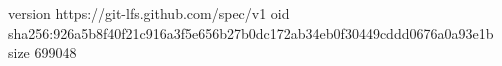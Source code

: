 version https://git-lfs.github.com/spec/v1
oid sha256:926a5b8f40f21c916a3f5e656b27b0dc172ab34eb0f30449cddd0676a0a93e1b
size 699048
